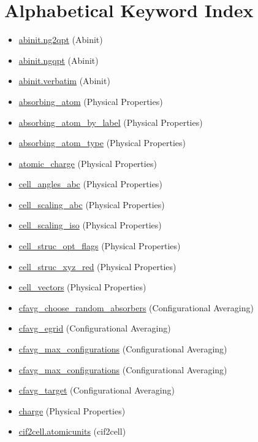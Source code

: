 \documentclass[11pt]{article}
\begin{document}
\section{Alphabetical Keyword Index}
\begin{itemize}
\item \hyperref[kw:abinit-ng2qpt]{abinit.ng2qpt} (Abinit)
\item \hyperref[kw:abinit-ngqpt]{abinit.ngqpt} (Abinit)
\item \hyperref[kw:abinit-verbatim]{abinit.verbatim} (Abinit)
\item \hyperref[kw:absorbing-atom]{absorbing\_atom} (Physical Properties)
\item \hyperref[kw:absorbing-atom-by-label]{absorbing\_atom\_by\_label} (Physical Properties)
\item \hyperref[kw:absorbing-atom-type]{absorbing\_atom\_type} (Physical Properties)
\item \hyperref[kw:atomic-charge]{atomic\_charge} (Physical Properties)
\item \hyperref[kw:cell-angles-abc]{cell\_angles\_abc} (Physical Properties)
\item \hyperref[kw:cell-scaling-abc]{cell\_scaling\_abc} (Physical Properties)
\item \hyperref[kw:cell-scaling-iso]{cell\_scaling\_iso} (Physical Properties)
\item \hyperref[kw:cell-struc-opt-flags]{cell\_struc\_opt\_flags} (Physical Properties)
\item \hyperref[kw:cell-struc-xyz-red]{cell\_struc\_xyz\_red} (Physical Properties)
\item \hyperref[kw:cell-vectors]{cell\_vectors} (Physical Properties)
\item \hyperref[kw:cfavg-choose-random-absorbers]{cfavg\_choose\_random\_absorbers} (Configurational Averaging)
\item \hyperref[kw:cfavg-egrid]{cfavg\_egrid} (Configurational Averaging)
\item \hyperref[kw:cfavg-max-configurations]{cfavg\_max\_configurations} (Configurational Averaging)
\item \hyperref[kw:cfavg-max-configurations]{cfavg\_max\_configurations} (Configurational Averaging)
\item \hyperref[kw:cfavg-target]{cfavg\_target} (Configurational Averaging)
\item \hyperref[kw:charge]{charge} (Physical Properties)
\item \hyperref[kw:cif2cell-atomicunits]{cif2cell.atomicunits} (cif2cell)

\end{itemize}
\end{document}

